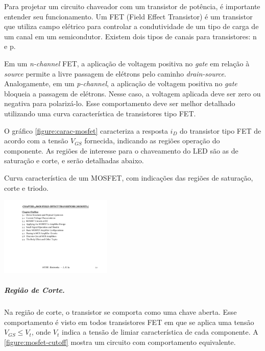	Para projetar um circuito chaveador com um transistor de potência, é importante entender seu funcionamento. Um FET (Field Effect Transistor) é um transistor que utiliza campo elétrico para controlar a condutividade de um tipo de carga de um canal em um semicondutor. Existem dois tipos de canais para transistores: n e p.
	
	Em um \textit{n-channel} FET, a aplicação de voltagem positiva no \textit{gate} em relação à \textit{source} permite a livre passagem de elétrons pelo caminho \textit{drain-source}. Analogamente, em um \textit{p-channel}, a aplicação de voltagem positiva no \textit{gate} bloqueia a passagem de elétrons. Nesse caso, a voltagem aplicada deve ser zero ou negativa para polarizá-lo. Esse comportamento deve ser melhor detalhado utilizando uma curva característica de transistores tipo FET.

	O gráfico \ref{figure:carac-mosfet} caracteriza a resposta $i_{D}$ do transistor tipo FET de acordo com a tensão $V_{GS}$ fornecida, indicando as regiões operação do componente. As regiões de interesse para o chaveamento do LED são as de saturação e corte, e serão detalhadas abaixo.
			
	\begin{chart}[h]
		\caption{\label{figure:carac-mosfet}Curva característica de um MOSFET, com indicações das regiões de saturação, corte e triodo.}
		\centering
		\includegraphics[page=8,width=0.4\textwidth, trim={16.5cm 9.89cm 3.6cm 3cm},clip]{circuits/Electronics_Ch5.pdf}
	\end{chart}

	\subparagraph{Região de Corte.}
	Na região de corte, o transistor se comporta como uma chave aberta. Esse comportamento é visto em todos transistores FET em que se aplica uma tensão $V_{GS} \leq V_{t}$, onde $V_{t}$ indica a tensão de limiar  característica de cada componente. A \autoref{figure:mosfet-cutoff} mostra um circuito com comportamento equivalente.
	
